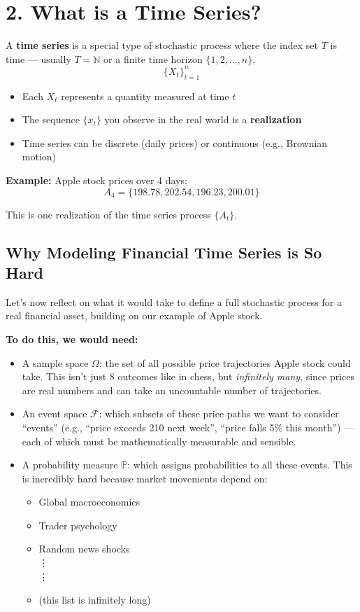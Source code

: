\documentclass[10pt]{article}
\begin{document}
	\section*{2. What is a Time Series?}
	
	A \textbf{time series} is a special type of stochastic process where the index set \( T \) is time — usually \( T = \mathbb{N} \) or a finite time horizon \( \{1, 2, \dots, n\} \).
	\[
	\{X_t\}_{t=1}^n
	\]
	
	\begin{itemize}
		\item Each \( X_t \) represents a quantity measured at time \( t \)
		\item The sequence \( \{x_t\} \) you observe in the real world is a \textbf{realization}
		\item Time series can be discrete (daily prices) or continuous (e.g., Brownian motion)
	\end{itemize}
	
	\textbf{Example:} Apple stock prices over 4 days:
	\[
	A_4 = \{198.78, 202.54, 196.23, 200.01\}
	\]
	
	This is one realization of the time series process \( \{A_t\} \).
	
	\subsection*{Why Modeling Financial Time Series is So Hard}
	Let’s now reflect on what it would take to define a full stochastic process for a real financial asset, building on our example of Apple stock.
	
	\textbf{To do this, we would need:}
	\begin{itemize}
		\item A sample space \( \Omega \): the set of all possible price trajectories Apple stock could take. This isn't just 8 outcomes like in chess, but \textit{infinitely many}, since prices are real numbers and can take an uncountable number of trajectories.
		\item An event space \( \mathcal{F} \): which subsets of these price paths we want to consider “events” (e.g., “price exceeds 210 next week”, “price falls 5\% this month”) — each of which must be mathematically measurable and sensible.
		\item A probability measure \( \mathbb{P} \): which assigns probabilities to all these events. This is incredibly hard because market movements depend on:
		\begin{itemize}
			\item Global macroeconomics
			\item Trader psychology
			\item Random news shocks \\ \vdots \\ \vdots
			\item (this list is infinitely long)

		\end{itemize}
	\end{itemize}
	
\end{document}
